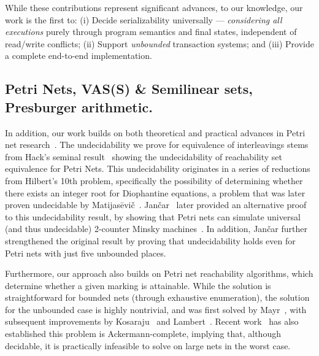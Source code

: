 %
While these contributions represent significant advances, to our knowledge, our work is the first to:
(i) Decide serializability universally --- \textit{considering all executions} purely through program semantics and final states, independent of read/write conflicts; 
(ii) Support \textit{unbounded} transaction systems; and
(iii) Provide a complete end-to-end implementation.

\subsection{Petri Nets, VAS(S) \& Semilinear sets, Presburger arithmetic.}
\label{sec:related:petri}


In addition, our work builds on both theoretical and practical advances in Petri net research~\cite{Mu89, Es96, Re12, EsNi24}. The undecidability we prove for equivalence of interleavings stems from Hack’s seminal result~\cite{Ha76, HaThesis76} showing the undecidability of reachability set equivalence for Petri Nets. This undecidability originates in a series of reductions from Hilbert’s 10th problem, specifically the possibility of determining whether there exists an integer root for Diophantine equations, a problem that was later proven undecidable by Matijasēvič~\cite{Ma70}.
%
Jančar~\cite{Ja95} later provided an alternative proof to this undecidability result, by showing that Petri nets can simulate universal (and thus undecidable) 2-counter Minsky machines~\cite{Mi67}. In addition, Jančar further strengthened the original result by proving that undecidability holds even for Petri nets with just five unbounded places.

Furthermore, our approach also builds on Petri net reachability algorithms, which determine whether a given marking is attainable. While the solution is straightforward for bounded nets (through exhaustive enumeration), the solution for the unbounded case is highly nontrivial, and was first solved by Mayr~\cite{Ma81}, with subsequent improvements by Kosaraju~\cite{Ko82} and Lambert~\cite{La92}. Recent work~\cite{CzWo22} has also established this problem is Ackermann-complete, implying that, although decidable, it is practically infeasible to solve on large nets in the worst case.

